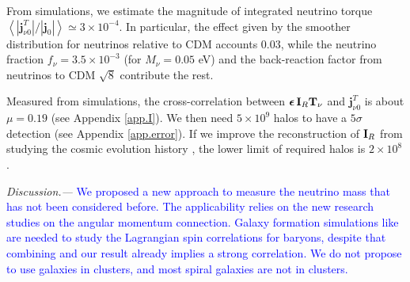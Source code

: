 \documentclass[aps,prd,twocolumn,amsmath,amssymb,amsfont,superscriptaddress,nofootinbib]{revtex4-1}
\newcommand{\bs}{\boldsymbol}
\newcommand{\T}{\bold{T}}
\newcommand{\I}{\bold{I}}
\newcommand{\spin}{\bs{j}}
\newcommand{\tcb}{\textcolor{blue}}
\begin{document}
From simulations, we estimate the magnitude of integrated neutrino torque $\left\langle|\spin^T_{\nu 0}|/|\spin_0|\right\rangle\simeq 3\times10^{-4}$. In particular, the effect given by the smoother distribution for neutrinos relative to CDM accounts 0.03, while the neutrino fraction $f_\nu=3.5\times 10^{-3}$ (for $M_\nu=0.05$ eV) and the back-reaction factor from neutrinos to CDM $\sqrt{8}$ \citep{2012MNRAS.420.2551B} contribute the rest.

Measured from simulations, the cross-correlation between $\bs{\epsilon}\,\I_R\T_\nu$ and $\spin^T_{\nu 0}$ is about $\mu=0.19$ (see Appendix \ref{app.I}). We then need $5\times 10^9$ halos to have a $5\sigma$ detection (see Appendix \ref{app.error}). If we improve the reconstruction of $\I_R$ from studying the cosmic evolution history \citep{2014ApJ...794...94W}, the lower limit of required halos is $2\times 10^8$.

\textit{Discussion.---}
\tcb{
We proposed a new approach to measure the neutrino mass that has not been considered before. 
The applicability relies on the new research studies on the angular momentum connection.
Galaxy formation simulations like \cite{2018arXiv180407306J,2016MNRAS.460.3772S} are needed to study the Lagrangian spin correlations for baryons, 
despite that combining \cite{2018arXiv180407306J} and our result already implies a strong correlation. 
We do not propose to use galaxies in clusters, and most spiral galaxies are not in clusters.
}
\end{document}
